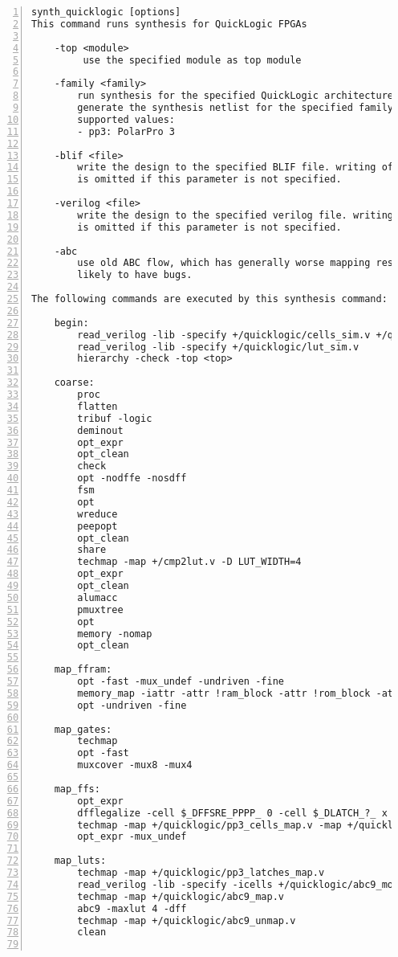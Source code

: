 \begin{lstlisting}[numbers=left,frame=single]
   synth_quicklogic [options]
This command runs synthesis for QuickLogic FPGAs

    -top <module>
         use the specified module as top module

    -family <family>
        run synthesis for the specified QuickLogic architecture
        generate the synthesis netlist for the specified family.
        supported values:
        - pp3: PolarPro 3 

    -blif <file>
        write the design to the specified BLIF file. writing of an output file
        is omitted if this parameter is not specified.

    -verilog <file>
        write the design to the specified verilog file. writing of an output file
        is omitted if this parameter is not specified.

    -abc
        use old ABC flow, which has generally worse mapping results but is less
        likely to have bugs.

The following commands are executed by this synthesis command:

    begin:
        read_verilog -lib -specify +/quicklogic/cells_sim.v +/quicklogic/pp3_cells_sim.v
        read_verilog -lib -specify +/quicklogic/lut_sim.v
        hierarchy -check -top <top>

    coarse:
        proc
        flatten
        tribuf -logic
        deminout
        opt_expr
        opt_clean
        check
        opt -nodffe -nosdff
        fsm
        opt
        wreduce
        peepopt
        opt_clean
        share
        techmap -map +/cmp2lut.v -D LUT_WIDTH=4
        opt_expr
        opt_clean
        alumacc
        pmuxtree
        opt
        memory -nomap
        opt_clean

    map_ffram:
        opt -fast -mux_undef -undriven -fine
        memory_map -iattr -attr !ram_block -attr !rom_block -attr logic_block -attr syn_ramstyle=auto -attr syn_ramstyle=registers -attr syn_romstyle=auto -attr syn_romstyle=logic
        opt -undriven -fine

    map_gates:
        techmap
        opt -fast
        muxcover -mux8 -mux4

    map_ffs:
        opt_expr
        dfflegalize -cell $_DFFSRE_PPPP_ 0 -cell $_DLATCH_?_ x
        techmap -map +/quicklogic/pp3_cells_map.v -map +/quicklogic/pp3_ffs_map.v
        opt_expr -mux_undef

    map_luts:
        techmap -map +/quicklogic/pp3_latches_map.v
        read_verilog -lib -specify -icells +/quicklogic/abc9_model.v
        techmap -map +/quicklogic/abc9_map.v
        abc9 -maxlut 4 -dff
        techmap -map +/quicklogic/abc9_unmap.v
        clean


\end{lstlisting}
